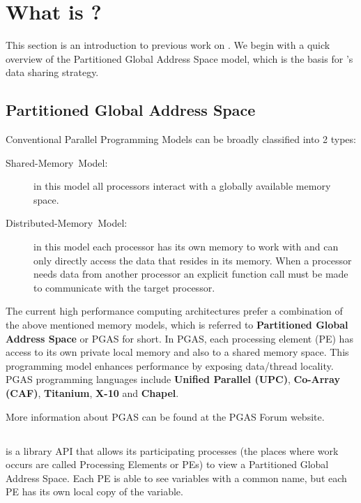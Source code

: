 
\section{What is \openshmem?}

This section is an introduction to previous work on \openshmem. We begin
with a quick overview of the Partitioned Global Address Space model,
which is the basis for \openshmem's data sharing strategy.


\subsection{Partitioned Global Address Space}

Conventional Parallel Programming Models can be broadly classified
into 2 types: 
\begin{description}
\item [{{Shared-Memory~Model:}}] in this model all processors interact
with a globally available memory space. 
\item [{{Distributed-Memory~Model:}}] in this model each processor has
its own memory to work with and can only directly access the data
that resides in its memory. When a processor needs data from another
processor an explicit function call must be made to communicate with
the target processor. 
\end{description}
The current high performance computing architectures prefer a combination
of the above mentioned memory models, which is referred to \textbf{Partitioned
Global Address Space} or PGAS for short. In PGAS, each processing
element (\ac{PE}) has access to its own private local memory and also to
a shared memory space. This programming model enhances performance
by exposing data/thread locality. PGAS programming languages include
\textbf{Unified Parallel \Clang (UPC)}, \textbf{Co-Array \Fortran (CAF)},
\textbf{Titanium}, \textbf{X-10} and \textbf{Chapel}.

More information about PGAS can be found at the PGAS Forum website.\cite{pgasfor}


\subsection{\openshmem}

%

\openshmem is a library \ac{API} that allows its participating processes (the
places where work occurs are called Processing Elements or \ac{PE}s) to
view a Partitioned Global Address Space. Each \ac{PE} is able to see
variables with a common name, but each \ac{PE} has its own local copy
of the variable.

